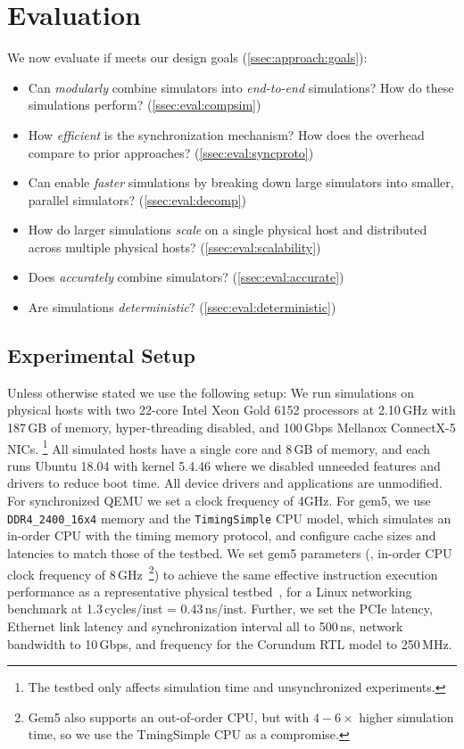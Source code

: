 \section{Evaluation}
\label{sec:eval}
We now evaluate if \sysname meets our design goals
(\autoref{ssec:approach:goals}):

\begin{itemize}
  \item Can \sysname \emph{modularly} combine simulators into
    \emph{end-to-end} simulations?
    How do these simulations perform?
    (\autoref{ssec:eval:compsim})
    \item How \textit{efficient} is the \sysname synchronization mechanism?
        How does the overhead compare to prior approaches?
        (\autoref{ssec:eval:syncproto})
  \item Can \sysname enable \emph{faster} simulations by breaking down
    large simulators into smaller, parallel simulators?
    (\autoref{ssec:eval:decomp})
  \item How do larger \sysname simulations \emph{scale} on a single
    physical host and distributed across multiple physical hosts?
    (\autoref{ssec:eval:scalability})
  \item Does \sysname \emph{accurately} combine simulators?
    (\autoref{ssec:eval:accurate})
  \item Are \sysname simulations \emph{deterministic}?
    (\autoref{ssec:eval:deterministic})
\end{itemize}


\subsection{Experimental Setup}
Unless otherwise stated we use the following setup:
%
We run simulations on physical hosts with two 22-core Intel Xeon Gold 6152
processors at 2.10\,GHz with 187\,GB of memory, hyper-threading disabled, and
100\,Gbps Mellanox ConnectX-5 NICs.%
\footnote{The testbed  only affects simulation time and unsynchronized experiments.}
%
All simulated hosts have a single core and 8\,GB of memory, and each runs Ubuntu
18.04 with kernel 5.4.46 where we disabled unneeded features and drivers to
reduce boot time.
%
All device drivers and applications are unmodified.
%
For synchronized QEMU we set a clock frequency of 4GHz.
%
For gem5, we use \texttt{DDR4\_2400\_16x4} memory and the \texttt{TimingSimple}
CPU model, which simulates an in-order CPU with the timing memory protocol, and
configure cache sizes and latencies to match those of the testbed.
%
We set gem5 parameters (\eg, in-order CPU clock frequency of
8\,GHz~\footnote{Gem5 also supports an out-of-order CPU, but with
$4-6\times$ higher simulation time, so we use the TmingSimple CPU as a
compromise.}) to achieve the same effective instruction execution
performance as a representative physical testbed~\cite{kaufmann:tas},
for a Linux networking benchmark at 1.3\,cycles/inst = 0.43\,ns/inst.
%
Further, we set the PCIe latency, Ethernet link latency and
synchronization interval all to 500\,ns, network bandwidth to
10\,Gbps, and frequency for the Corundum RTL model to 250\,MHz.


